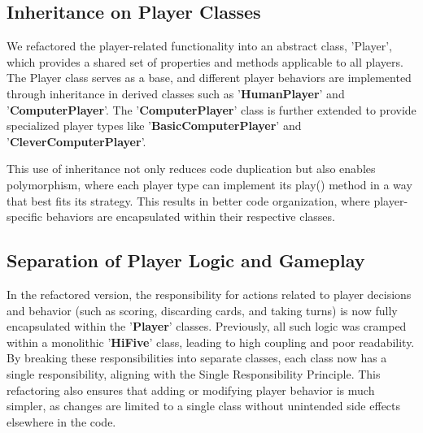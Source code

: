 \documentclass[a4paper, 12pt]{report}
\begin{document}
    \subsection{Inheritance on Player Classes}
    We refactored the player-related functionality into an abstract class, 'Player', which provides a shared set of properties and methods applicable to all players. The Player class serves as a base, and different player behaviors are implemented through inheritance in derived classes such as '\textbf{HumanPlayer}' and '\textbf{ComputerPlayer}'. The '\textbf{ComputerPlayer}' class is further extended to provide specialized player types like '\textbf{BasicComputerPlayer}' and '\textbf{CleverComputerPlayer}'.

    This use of inheritance not only reduces code duplication but also enables polymorphism, where each player type can implement its play() method in a way that best fits its strategy. This results in better code organization, where player-specific behaviors are encapsulated within their respective classes.

    \subsection{Separation of Player Logic and Gameplay}
    In the refactored version, the responsibility for actions related to player decisions and behavior (such as scoring, discarding cards, and taking turns) is now fully encapsulated within the '\textbf{Player}' classes. Previously, all such logic was cramped within a monolithic '\textbf{HiFive}' class, leading to high coupling and poor readability. By breaking these responsibilities into separate classes, each class now has a single responsibility, aligning with the Single Responsibility Principle. This refactoring also ensures that adding or modifying player behavior is much simpler, as changes are limited to a single class without unintended side effects elsewhere in the code.

    \newpage
\end{document}
